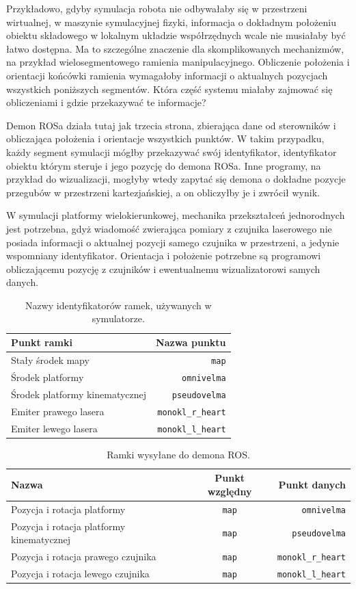 	Przykładowo, gdyby symulacja robota nie odbywałaby się w przestrzeni wirtualnej, w maszynie symulacyjnej fizyki, 
	informacja o dokładnym położeniu obiektu składowego w lokalnym układzie współrzędnych wcale nie musiałaby być łatwo dostępna.
	Ma to szczególne znaczenie dla skomplikowanych mechanizmów, na przykład wielosegmentowego ramienia manipulacyjnego.
	Obliczenie położenia i orientacji końcówki ramienia wymagałoby informacji o aktualnych pozycjach wszystkich poniższych segmentów.
	Która część systemu miałaby zajmować się obliczeniami i gdzie przekazywać te informacje?
	
	Demon ROSa działa tutaj jak trzecia strona, zbierająca dane od sterowników i obliczająca położenia i orientacje wszystkich punktów.
	W takim przypadku, każdy segment symulacji mógłby przekazywać swój identyfikator, identyfikator obiektu którym steruje i jego pozycję do demona ROSa.
	Inne programy, na przykład do wizualizacji, mogłyby wtedy zapytać się demona o dokładne pozycje przegubów w przestrzeni kartezjańskiej, a on obliczyłby je i zwrócił wynik.
	
	W symulacji platformy wielokierunkowej, mechanika przekształceń jednorodnych jest potrzebna, gdyż wiadomość zwierająca pomiary z czujnika laserowego nie posiada informacji o aktualnej pozycji samego czujnika w przestrzeni, a jedynie wspomniany identyfikator. 
	Orientacja i położenie potrzebne są programowi obliczającemu pozycję z czujników i ewentualnemu wizualizatorowi samych danych.
	
	
	\begin{table}
		\centering
		\begin{tabular}{l r}
			Punkt ramki & Nazwa punktu \\
			\hline
			Stały środek mapy & \texttt{map} \\
			Środek platformy & \texttt{omnivelma} \\
			Środek platformy kinematycznej & \texttt{pseudovelma} \\
			Emiter prawego lasera & \texttt{monokl\_r\_heart} \\
			Emiter lewego lasera & \texttt{monokl\_l\_heart} \\
		\end{tabular}
		\caption{Nazwy identyfikatorów ramek, używanych w symulatorze.}
		\label{tab:frames}
	\end{table}
		
	\begin{table}
		\centering
		\begin{tabular}{l c r}
			Nazwa & Punkt względny & Punkt danych \\
			\hline
			Pozycja i rotacja platformy & \texttt{map} & \texttt{omnivelma} \\
			Pozycja i rotacja platformy kinematycznej & \texttt{map} & \texttt{pseudovelma} \\
			Pozycja i rotacja prawego czujnika & \texttt{map} & \texttt{monokl\_r\_heart} \\
			Pozycja i rotacja lewego czujnika & \texttt{map} & \texttt{monokl\_l\_heart} \\
		\end{tabular}
		\caption{Ramki wysyłane do demona ROS.}
		\label{tab:frame_send}
	\end{table}
			
